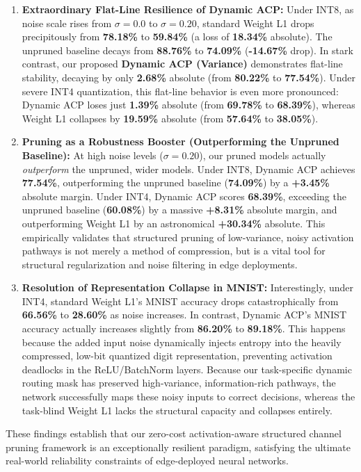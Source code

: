 \documentclass{article}
\theoremstyle{plain}
\theoremstyle{definition}
\theoremstyle{remark}
\begin{document}
\begin{enumerate}
    \item \textbf{Extraordinary Flat-Line Resilience of Dynamic ACP:} Under INT8, as noise scale rises from $\sigma=0.0$ to $\sigma=0.20$, standard Weight L1 drops precipitously from \textbf{78.18\%} to \textbf{59.84\%} (a loss of \textbf{18.34\%} absolute). The unpruned baseline decays from \textbf{88.76\%} to \textbf{74.09\%} (\textbf{-14.67\%} drop). In stark contrast, our proposed \textbf{Dynamic ACP (Variance)} demonstrates flat-line stability, decaying by only \textbf{2.68\%} absolute (from \textbf{80.22\%} to \textbf{77.54\%}). Under severe INT4 quantization, this flat-line behavior is even more pronounced: Dynamic ACP loses just \textbf{1.39\%} absolute (from \textbf{69.78\%} to \textbf{68.39\%}), whereas Weight L1 collapses by \textbf{19.59\%} absolute (from \textbf{57.64\%} to \textbf{38.05\%}).
    
    \item \textbf{Pruning as a Robustness Booster (Outperforming the Unpruned Baseline):} At high noise levels ($\sigma=0.20$), our pruned models actually \textit{outperform} the unpruned, wider models. Under INT8, Dynamic ACP achieves \textbf{77.54\%}, outperforming the unpruned baseline (\textbf{74.09\%}) by a \textbf{+3.45\%} absolute margin. Under INT4, Dynamic ACP scores \textbf{68.39\%}, exceeding the unpruned baseline (\textbf{60.08\%}) by a massive \textbf{+8.31\%} absolute margin, and outperforming Weight L1 by an astronomical \textbf{+30.34\%} absolute. This empirically validates that structured pruning of low-variance, noisy activation pathways is not merely a method of compression, but is a vital tool for structural regularization and noise filtering in edge deployments.
    
    \item \textbf{Resolution of Representation Collapse in MNIST:} Interestingly, under INT4, standard Weight L1's MNIST accuracy drops catastrophically from \textbf{66.56\%} to \textbf{28.60\%} as noise increases. In contrast, Dynamic ACP's MNIST accuracy actually increases slightly from \textbf{86.20\%} to \textbf{89.18\%}. This happens because the added input noise dynamically injects entropy into the heavily compressed, low-bit quantized digit representation, preventing activation deadlocks in the ReLU/BatchNorm layers. Because our task-specific dynamic routing mask has preserved high-variance, information-rich pathways, the network successfully maps these noisy inputs to correct decisions, whereas the task-blind Weight L1 lacks the structural capacity and collapses entirely.
\end{enumerate}

These findings establish that our zero-cost activation-aware structured channel pruning framework is an exceptionally resilient paradigm, satisfying the ultimate real-world reliability constraints of edge-deployed neural networks.
\end{document}
